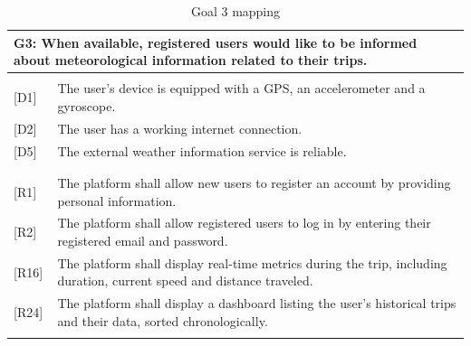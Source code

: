 \newpage
\begin{table}[H]
    \centering
    \renewcommand{\arraystretch}{1.5}
    
    \begin{tabularx}{\textwidth}{|l X|}
        \hline
        \multicolumn{2}{|p{\dimexpr\textwidth-2\tabcolsep}|}{\textbf{G3}: When available, registered users would like to be informed about meteorological information related to their trips.} \\
        \hline
        & \\[-1em] %
        
        
        {[D1]} &  The user’s device is equipped with a GPS, an accelerometer and a gyroscope. \\
        {[D2]} & The user has a working internet connection. \\
        {[D5]} & The external weather information service is reliable.\\
        & \\
        \hline
        & \\[-1em]
        
        {[R1]} & The platform shall allow new users to register an account by providing personal information. \\
        {[R2]} & The platform shall allow registered users to log in by entering their registered email and password. \\
        {[R16]} & The platform shall display real-time metrics during the trip, including duration, current speed and
distance traveled. \\
        {[R24]} & The platform shall display a dashboard listing the user’s historical trips and their data, sorted chronologically. \\ %
        & \\
        \hline
    \end{tabularx}
    \caption{Goal 3 mapping}
\end{table}

